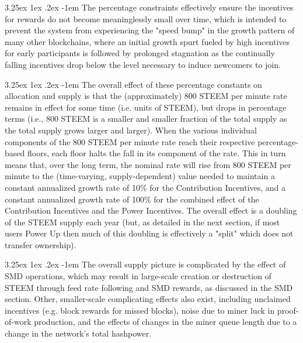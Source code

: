 \documentclass{article}
\makeatletter
\renewcommand\paragraph{\@startsection{paragraph}{5}{\z@}%
  {3.25ex \@plus1ex \@minus.2ex}%
  {-1em}%
  {\normalfont\normalsize\bfseries}}
\makeatother
\begin{document}
        \paragraph{}
            The percentage constraints effectively ensure the incentives for rewards do not become meaninglessly small over time, which is intended to prevent the system from experiencing the "speed bump" in the growth pattern of many other blockchains, where an initial growth spurt fueled by high incentives for early participants is followed by prolonged stagnation as the continually falling incentives drop below the level necessary to induce newcomers to join.

        \paragraph{}
            The overall effect of these percentage constants on allocation and supply is that the (approximately) 800 STEEM per minute rate remains in effect for some time (i.e. units of STEEM), but drops in percentage terms (i.e., 800 STEEM is a smaller and smaller fraction of the total supply as the total supply grows larger and larger). When the various individual components of the 800 STEEM per minute rate reach their respective percentage-based floors, each floor halts the fall in its component of the rate. This in turn means that, over the long term, the nominal rate will rise from 800 STEEM per minute to the (time-varying, supply-dependent) value needed to maintain a constant annualized growth rate of 10\% for the Contribution Incentives, and a constant annualized growth rate of 100\% for the combined effect of the Contribution Incentives and the Power Incentives. The overall effect is a doubling of the STEEM supply each year (but, as detailed in the next section, if most users Power Up then much of this doubling is effectively a "split" which does not transfer ownership).

        \paragraph{}
            The overall supply picture is complicated by the effect of SMD operations, which may result in large-scale creation or destruction of STEEM through feed rate following and SMD rewards, as discussed in the SMD section. Other, smaller-scale complicating effects also exist, including unclaimed incentives (e.g. block rewards for missed blocks), noise due to miner luck in proof-of-work production, and the effects of changes in the miner queue length due to a change in the network's total hashpower.
\end{document}
